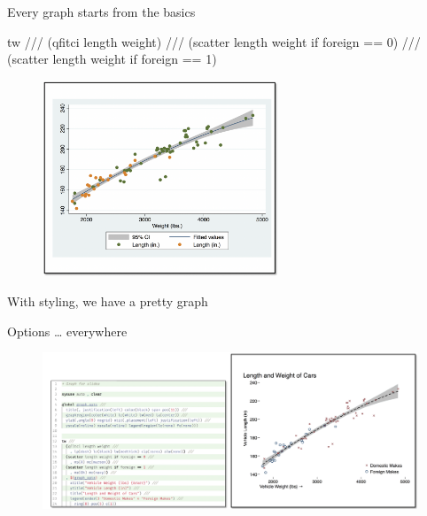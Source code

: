 \documentclass[aspectratio=169]{beamer}
\begin{document}
\begin{frame}{Every graph starts from the basics}
	\begin{multicols}{2}	
		
		\leavevmode 	\newline  tw ///
		 	\newline   (qfitci length weight) ///
		 	\newline  (scatter length weight 
		 	\newline  if foreign == 0) ///
		 	\newline  (scatter length weight 
		 	\newline  if foreign == 1) 
		
		\begin{figure}
			\centering
			\includegraphics[width=70mm]{img/Basics}
		\end{figure}
		
	\end{multicols}
\end{frame}


\begin{frame}{With styling, we have a pretty graph}
		
	Options … everywhere
		
		\begin{figure}
			\centering
			\includegraphics[width=135mm]{img/Styling}
		\end{figure}
		
\end{frame}
\end{document}
